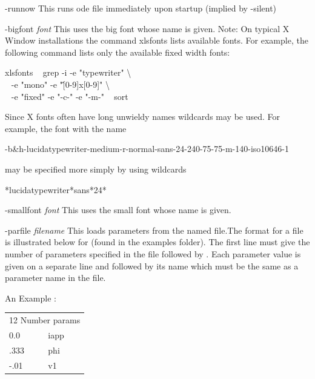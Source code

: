 \begin{description}
\item{-runnow} This runs ode file immediately upon startup (implied by -silent)
\item{-bigfont \emph{font}} This uses the big font whose name is given. Note:  On  typical  X  Window  installations the command xlsfonts lists
       available fonts.  For example, the following  command  lists  only  the
       available fixed width fonts:
\begin{center}\ttfamily\begin{minipage}{55ex}
              xlsfonts \textbar~ grep -i -e "typewriter" \textbackslash \\
                     $~~$ -e "mono" -e "\^[0-9]x[0-9]" \textbackslash \\
                     $~~$ -e "fixed" -e "-c-" -e "-m-" \textbar~ sort
\end{minipage}\end{center}
Since X fonts often have long unwieldy names wildcards may be used.  For example, the font with the name
\begin{center}\ttfamily
	-b\&h-lucidatypewriter-medium-r-normal-sans-24-240-75-75-m-140-iso10646-1
\end{center}
may be specified more simply by using wildcards
\begin{center}\ttfamily
*lucidatypewriter*sans*24*
\end{center}
\item{-smallfont \emph{font}} This uses the small font whose name is given.
\item{-parfile \emph{filename}} This loads parameters from the named file.The format for a {} file is illustrated below for {} (found in the examples {} folder).  The first line must give the number of parameters specified in the file followed by {}.  Each parameter value is given on a separate line and followed by its name which must be the same as a parameter name in the {} file. 
\begin{center}
\begin{minipage}{55ex}
\begin{center}An Example {}:
\end{center}\ttfamily
\begin{tabular}{ll}
\multicolumn{2}{l}{12 Number params}\\
0.0 & iapp\\
.333 & phi\\
-.01 & v1\\

\end{tabular}
\end{minipage}
\end{center}
\end{description}

